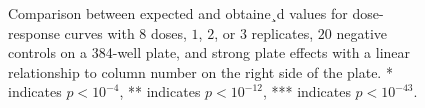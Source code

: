 \begin{figure}[!htb]
  \caption{Comparison between expected and obtaine¸d values for dose-response
    curves with $8$ doses, $1$, $2$, or $3$ replicates, $20$ negative controls
    on a 384-well plate, and strong plate effects with a linear relationship to
    column number on the right side of the plate.
    * indicates ${p<10^{-4}}$,
    ** indicates ${p<10^{-12}}$,
    *** indicates ${p<10^{-43}}$.}
  \label{fig:dose_response_paper}
\end{figure}


